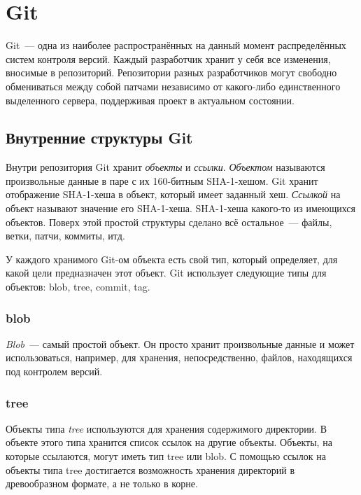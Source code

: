 \section{Git}

Git~--- одна из наиболее распространённых на данный момент
распределённых систем контроля версий. Каждый разработчик хранит у
себя все изменения, вносимые в репозиторий. Репозитории разных
разработчиков могут свободно обмениваться между собой патчами
независимо от какого-либо единственного выделенного сервера,
поддерживая проект в актуальном состоянии.

\subsection{Внутренние структуры Git}
\label{sec:git-internals}

Внутри репозитория Git хранит \emph{объекты} и \emph{ссылки}.
\emph{Объектом} называются произвольные данные в паре с их 160-битным
SHA-1-хешом. Git хранит отображение SHA-1-хеша в объект, который имеет
заданный хеш. \emph{Ссылкой} на объект называют значение его
SHA-1-хеша. SHA-1-хеша какого-то из имеющихся объектов. Поверх этой
простой структуры сделано всё остальное~--- файлы, ветки, патчи,
коммиты, итд.

У каждого хранимого Git-ом объекта есть свой тип, который определяет,
для какой цели предназначен этот объект. Git использует следующие типы
для объектов: blob, tree, commit, tag.


\subsubsection{blob}

\emph{Blob}~--- самый простой объект. Он просто хранит произвольные
данные и может использоваться, например, для хранения,
непосредственно, файлов, находящихся под контролем версий.

\subsubsection{tree}

Объекты типа \emph{tree} используются для хранения содержимого
директории. В объекте этого типа хранится список ссылок на другие
объекты. Объекты, на которые ссылаются, могут иметь тип tree или blob.
С помощью ссылок на объекты типа tree достигается возможность хранения
директорий в древообразном формате, а не только в корне.

